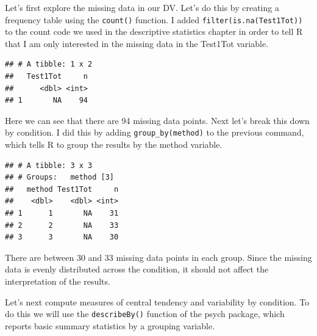 \documentclass[
]{book}
\newenvironment{Shaded}{\begin{snugshade}}{\end{snugshade}}
\newcommand{\KeywordTok}[1]{\textcolor[rgb]{0.13,0.29,0.53}{\textbf{#1}}}
\newcommand{\NormalTok}[1]{#1}
\newcommand{\OperatorTok}[1]{\textcolor[rgb]{0.81,0.36,0.00}{\textbf{#1}}}
\newcommand{\StringTok}[1]{\textcolor[rgb]{0.31,0.60,0.02}{#1}}
\begin{document}
Let's first explore the missing data in our DV. Let's do this by creating a frequency table using the \texttt{count()} function. I added \texttt{filter(is.na(Test1Tot))} to the count code we used in the descriptive statistics chapter in order to tell R that I am only interested in the missing data in the Test1Tot variable.

\begin{Shaded}
\end{Shaded}

\begin{verbatim}
## # A tibble: 1 x 2
##   Test1Tot     n
##      <dbl> <int>
## 1       NA    94
\end{verbatim}

Here we can see that there are 94 missing data points. Next let's break this down by condition. I did this by adding \texttt{group\_by(method)} to the previous command, which tells R to group the results by the method variable.

\begin{Shaded}
\end{Shaded}

\begin{verbatim}
## # A tibble: 3 x 3
## # Groups:   method [3]
##   method Test1Tot     n
##    <dbl>    <dbl> <int>
## 1      1       NA    31
## 2      2       NA    33
## 3      3       NA    30
\end{verbatim}

There are between 30 and 33 missing data points in each group. Since the missing data is evenly distributed across the condition, it should not affect the interpretation of the results.

Let's next compute measures of central tendency and variability by condition. To do this we will use the \texttt{describeBy()} function of the psych package, which reports basic summary statistics by a grouping variable.
\end{document}
